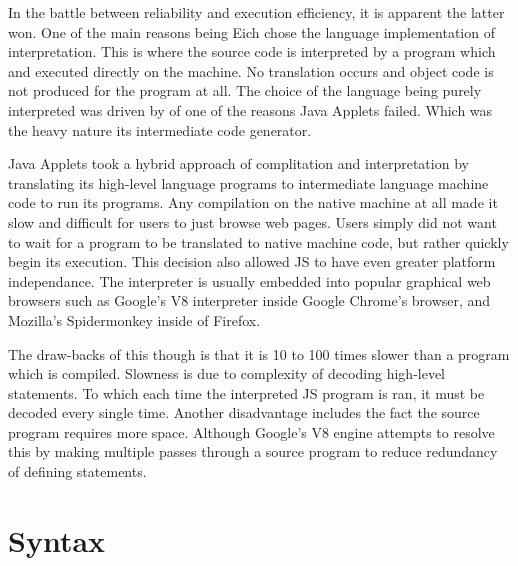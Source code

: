 \documentclass[man]{apa}
\begin{document}
In the battle between reliability and execution efficiency, it is apparent the latter won. One of the main reasons being Eich chose the language implementation of interpretation. This is where the source code is interpreted by a program which and executed directly on the machine. No translation occurs and object code is not produced for the program at all. The choice of the language being purely interpreted was driven by of one of the reasons Java Applets failed. Which was the heavy nature its intermediate code generator.

Java Applets took a hybrid approach of complitation and interpretation by translating its high-level language programs to intermediate language machine code to run its programs. Any compilation on the native machine at all made it slow and difficult for users to just browse web pages. Users simply did not want to wait for a program to be translated to native machine code, but rather quickly begin its execution. This decision also allowed JS to have even greater platform independance. The interpreter is usually embedded into popular graphical web browsers such as Google's V8 interpreter inside Google Chrome's browser, and Mozilla's Spidermonkey inside of Firefox.

The draw-backs of this though is that it is 10 to 100 times slower than a program which is compiled. Slowness is due to complexity of decoding high-level statements. To which each time the interpreted JS program is ran, it must be decoded every single time. Another disadvantage includes the fact the source program requires more space. Although Google's V8 engine attempts to resolve this by making multiple passes through a source program to reduce redundancy of defining statements.

\section{Syntax}
\lstset{ %
	basicstyle=\small,
	tabsize=4
}
\end{document}
